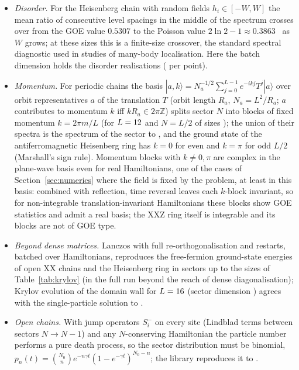 \documentclass[11pt]{article}
\begin{document}
\begin{itemize}
of open chains, to .
\item \emph{Disorder.} For the Heisenberg chain with random fields $h_i\in[-W,W]$ the mean ratio of consecutive
level spacings in the middle of the spectrum crosses over from the GOE value $0.5307$ to the Poisson value
$2\ln2-1\approx0.3863$~\cite{oganesyan2007,atas2013} as $W$ grows; at these sizes this is a finite-size crossover,
the standard spectral diagnostic used in studies of many-body localisation.
Here the batch dimension holds the disorder realisations
( per point).
\item \emph{Momentum.} For periodic chains the basis $|a,k\rangle=N_a^{-1/2}\sum_{j=0}^{L-1}e^{-ikj}T^j|a\rangle$ over
orbit representatives $a$ of the translation $T$ (orbit length $R_a$, $N_a=L^2/R_a$; $a$ contributes to momentum $k$
iff $kR_a\in2\pi\mathbb Z$) splits sector $N$ into blocks of fixed momentum
$k=2\pi m/L$ (for $L=\IfFileExists{generated/chains.tex}{\ChainMomL}{12}$ and $N=L/2$ of sizes
); the union of their spectra is the
spectrum of the sector to , and the ground state of
the antiferromagnetic Heisenberg ring has $k=0$ for even and $k=\pi$ for odd $L/2$ (Marshall's sign rule). Momentum
blocks with $k\ne0,\pi$ are complex in the plane-wave basis even for real Hamiltonians, one of the cases of
Section~\ref{sec:numerics} where the field is fixed by the problem, at least in this basis: combined with reflection,
time reversal leaves each $k$-block invariant, so for non-integrable translation-invariant Hamiltonians these blocks
show GOE statistics and admit a real basis; the XXZ ring itself is integrable and its blocks are not of GOE type.
\item \emph{Beyond dense matrices.} Lanczos with full re-orthogonalisation and restarts, batched over
Hamiltonians, reproduces the free-fermion ground-state energies of open XX chains and the Heisenberg ring in
sectors up to the sizes of Table~\ref{tab:krylov} (in the full run beyond the reach of dense diagonalisation); Krylov evolution of the domain wall for
$L=\IfFileExists{generated/chains.tex}{\ChainKDWL}{16}$ (sector dimension
) agrees with the single-particle solution to
.
\item \emph{Open chains.} With jump operators $S^-_i$ on every site (Lindblad terms between sectors $N\to N-1$)
and any $N$-conserving Hamiltonian the particle number performs a pure death process, so the sector
distribution must be binomial, $p_n(t)=\binom{N_0}{n}e^{-n\gamma t}(1-e^{-\gamma t})^{N_0-n}$; the library
reproduces it to .
\end{itemize}
\end{document}
